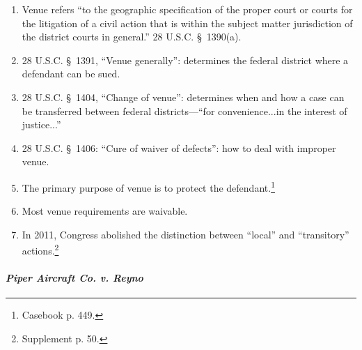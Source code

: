 \begin{enumerate}
    \item Venue refers ``to the geographic specification of the proper court 
    or courts for the litigation of a civil action that is within the subject 
    matter jurisdiction of the district courts in general.'' 28 U.S.C. \S\ 
    1390(a).
    \item 28 U.S.C. \S\ 1391, ``Venue generally'': determines the federal 
    district where a defendant can be sued.
    \item 28 U.S.C. \S\ 1404, ``Change of venue'': determines when and how a 
    case can be transferred between federal districts---``for convenience...in 
    the interest of justice...''
    \item 28 U.S.C. \S\ 1406: ``Cure of waiver of defects'': how to deal with 
    improper venue.
    \item The primary purpose of venue is to protect the 
    defendant.\footnote{Casebook p. 449.}
    \item Most venue requirements are waivable.
    \item In 2011, Congress abolished the distinction between ``local'' and 
    ``transitory'' actions.\footnote{Supplement p. 50.}
\end{enumerate}

\paragraph{\emph{Piper Aircraft Co. v. Reyno}}

